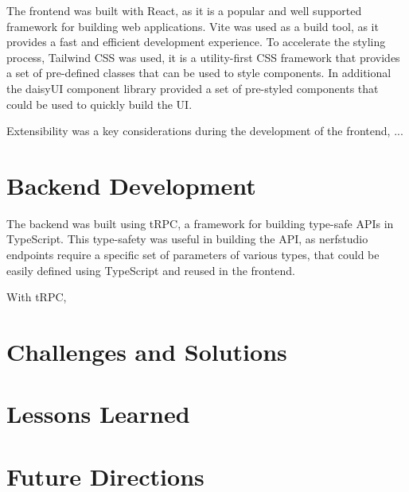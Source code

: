 The frontend was built with React, as it is a popular and well supported framework for building web applications.
Vite was used as a build tool, as it provides a fast and efficient development experience.
To accelerate the styling process, Tailwind CSS was used, it is a utility-first CSS framework that provides a set of pre-defined classes that can be used to style components.
In additional the daisyUI component library provided a set of pre-styled components that could be used to quickly build the UI.

Extensibility was a key considerations during the development of the frontend, ... 



\section{Backend Development}
\label{sec:system:backend}


The backend was built using tRPC, a framework for building type-safe APIs in TypeScript.
This type-safety was useful in building the API, as nerfstudio endpoints require a specific set of parameters of various types, that could be easily defined using TypeScript and reused in the frontend.

With tRPC, 

\section{Challenges and Solutions}
\label{sec:system:challenges}


\section{Lessons Learned}
\label{sec:system:lessons}

\section{Future Directions}
\label{sec:system:future}
